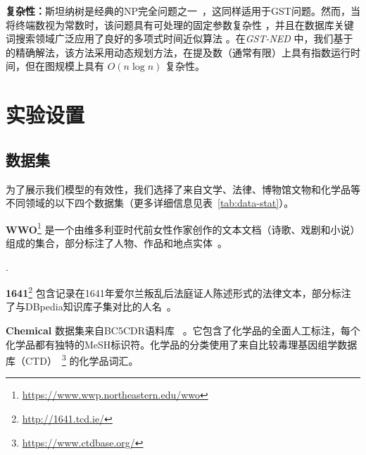 \documentclass[11pt]{article}
\begin{document}
\noindent
\textbf{复杂性：}斯坦纳树是经典的NP完全问题之一~\cite{ding2006finding}，这同样适用于GST问题。然而，当将终端数视为常数时，该问题具有可处理的固定参数复杂性 \cite{downey2013fundamentals}，并且在数据库关键词搜索领域广泛应用了良好的多项式时间近似算法 \cite{ding2006finding,kacholia2005bidirectional,li2016efficient}。在\emph{GST-NED} 中，我们基于 \cite{ding2006finding} 的精确解法，该方法采用动态规划方法，在提及数（通常有限）上具有指数运行时间，但在图规模上具有 $O(n\log n)$ 复杂性。
\section{实验设置}
\subsection{数据集}
为了展示我们模型的有效性，我们选择了来自文学、法律、博物馆文物和化学品等不同领域的以下四个数据集（更多详细信息见表~\ref{tab:data-stat}）。

\noindent
\textbf{WWO}\footnote{\url{https://www.wwp.northeastern.edu/wwo}} 是一个由维多利亚时代前女性作家创作的文本文档（诗歌、戏剧和小说）组成的集合，部分标注了人物、作品和地点实体~\cite{flanders2010encoding}。

\begin{table}
\caption{\label{tab:data-stat}四个使用数据集的数据统计：文档总数 ($\#D$)、提及总数 ($\#M$)、知识图谱中的节点数 ($\#N$) 和边数 ($\#E$)、每个提及的平均候选数 ($\#C$) 以及候选实体的召回率，即在候选项中具有黄金实体的提及比例 ($\#R$)}.
\end{table}

\noindent
\textbf{1641}\footnote{\url{http://1641.tcd.ie/}} 包含记录在1641年爱尔兰叛乱后法庭证人陈述形式的法律文本，部分标注了与DBpedia知识库子集对比的人名~\cite{klie2020zero}。

\noindent
\textbf{Chemical} 数据集来自BC5CDR语料库 ~\cite{li2016biocreative}。它包含了化学品的全面人工标注，每个化学品都有独特的MeSH标识符。化学品的分类使用了来自比较毒理基因组学数据库（CTD）~\footnote{\url{https://www.ctdbase.org/}} 的化学品词汇。
\end{document}
